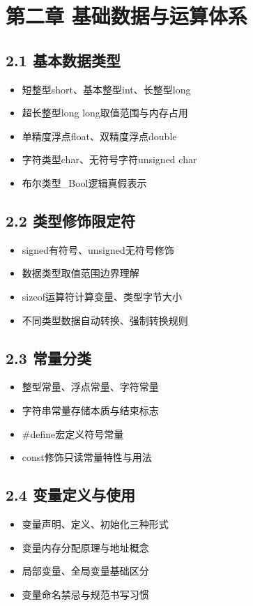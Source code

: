 \section*{第二章 基础数据与运算体系}
\subsection*{2.1 基本数据类型}
\begin{itemize}
\item 短整型short、基本整型int、长整型long
\item 超长整型long long取值范围与内存占用
\item 单精度浮点float、双精度浮点double
\item 字符类型char、无符号字符unsigned char
\item 布尔类型\_Bool逻辑真假表示
\end{itemize}

\subsection*{2.2 类型修饰限定符}
\begin{itemize}
\item signed有符号、unsigned无符号修饰
\item 数据类型取值范围边界理解
\item sizeof运算符计算变量、类型字节大小
\item 不同类型数据自动转换、强制转换规则
\end{itemize}

\subsection*{2.3 常量分类}
\begin{itemize}
\item 整型常量、浮点常量、字符常量
\item 字符串常量存储本质与结束标志
\item \#define宏定义符号常量
\item const修饰只读常量特性与用法
\end{itemize}

\subsection*{2.4 变量定义与使用}
\begin{itemize}
\item 变量声明、定义、初始化三种形式
\item 变量内存分配原理与地址概念
\item 局部变量、全局变量基础区分
\item 变量命名禁忌与规范书写习惯
\end{itemize}


